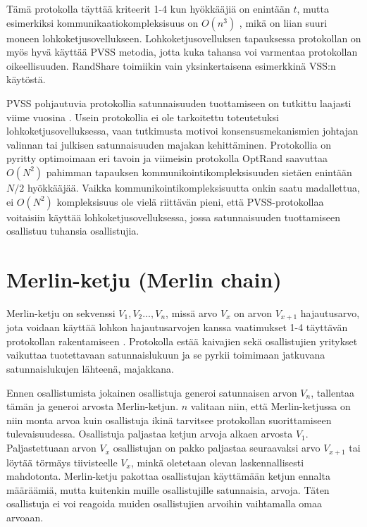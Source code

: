 Tämä protokolla täyttää kriteerit 1-4 kun hyökkääjiä on enintään $t$, mutta esimerkiksi kommunikaatiokompleksisuus on $O(n^3)$ \cite{syta_scalable_2017}, mikä on liian suuri moneen lohkoketjusovellukseen. Lohkoketjusovelluksen tapauksessa protokollan on myös hyvä käyttää PVSS metodia, jotta kuka tahansa voi varmentaa protokollan oikeellisuuden. RandShare toimiikin vain yksinkertaisena esimerkkinä VSS:n käytöstä. 

PVSS pohjautuvia protokollia satunnaisuuden tuottamiseen on tutkittu laajasti viime vuosina \cite{bhat2022optrand}. Usein protokollia ei ole tarkoitettu toteutetuksi lohkoketjusovelluksessa, vaan tutkimusta motivoi konsensusmekanismien johtajan valinnan tai julkisen satunnaisuuden majakan kehittäminen. Protokollia on pyritty optimoimaan eri tavoin ja viimeisin protokolla OptRand saavuttaa $O(N^2)$ pahimman tapauksen kommunikointikompleksisuuden \cite{bhat2022optrand} sietäen enintään $N/2$ hyökkääjää. Vaikka kommunikointikompleksisuutta onkin saatu madallettua, ei $O(N^2)$ kompleksisuus ole vielä riittävän pieni, että PVSS-protokollaa voitaisiin käyttää lohkoketjusovelluksessa, jossa satunnaisuuden tuottamiseen osallistuu tuhansia osallistujia. 

\section{Merlin-ketju (Merlin chain)}

Merlin-ketju on sekvenssi $V_1, V_2 ... , V_n$, missä arvo $V_x$ on arvon $V_{x+1}$ hajautusarvo, jota voidaan käyttää lohkon hajautusarvojen kanssa vaatimukset 1-4 täyttävän protokollan rakentamiseen \cite{MerlinChains}. Protokolla estää kaivajien sekä osallistujien yritykset vaikuttaa tuotettavaan satunnaislukuun ja se pyrkii toimimaan jatkuvana satunnaislukujen lähteenä, majakkana. 

Ennen osallistumista jokainen osallistuja generoi satunnaisen arvon $V_n$, tallentaa tämän ja generoi arvosta Merlin-ketjun. $n$ valitaan niin, että Merlin-ketjussa on niin monta arvoa kuin osallistuja ikinä tarvitsee protokollan suorittamiseen tulevaisuudessa. Osallistuja paljastaa ketjun arvoja alkaen arvosta $V_1$. Paljastettuaan arvon $V_x$ osallistujan on pakko paljastaa seuraavaksi arvo $V_{x+1}$ tai löytää törmäys tiivisteelle $V_x$, minkä oletetaan olevan laskennallisesti mahdotonta. Merlin-ketju pakottaa osallistujan käyttämään ketjun ennalta määräämiä, mutta kuitenkin muille osallistujille satunnaisia, arvoja. Täten osallistuja ei voi reagoida muiden osallistujien arvoihin vaihtamalla omaa arvoaan.  

